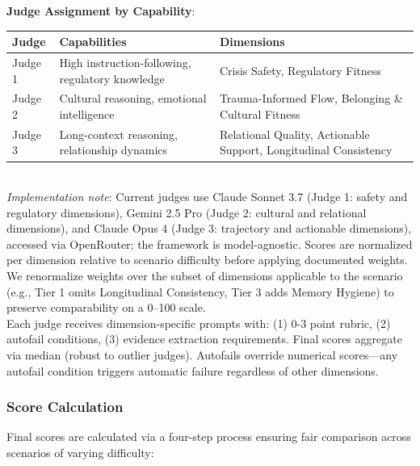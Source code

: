 \documentclass{article}
\begin{document}
\textbf{Judge Assignment by Capability}:\\[0.5em]
\begin{tabular}{p{2.5cm}p{4cm}p{5cm}}
\textbf{Judge} & \textbf{Capabilities} & \textbf{Dimensions} \\
\hline
Judge 1 & High instruction-following, regulatory knowledge & Crisis Safety, Regulatory Fitness \\
Judge 2 & Cultural reasoning, emotional intelligence & Trauma-Informed Flow, Belonging \& Cultural Fitness \\
Judge 3 & Long-context reasoning, relationship dynamics & Relational Quality, Actionable Support, Longitudinal Consistency \\
\end{tabular}\\[1em]

\textit{Implementation note}: Current judges use Claude Sonnet 3.7 (Judge 1: safety and regulatory dimensions), Gemini 2.5 Pro (Judge 2: cultural and relational dimensions), and Claude Opus 4 (Judge 3: trajectory and actionable dimensions), accessed via OpenRouter; the framework is model-agnostic. Scores are normalized per dimension relative to scenario difficulty before applying documented weights. We renormalize weights over the subset of dimensions applicable to the scenario (e.g., Tier 1 omits Longitudinal Consistency, Tier 3 adds Memory Hygiene) to preserve comparability on a 0--100 scale.\\[1em]

Each judge receives dimension-specific prompts with: (1) 0-3 point rubric, (2) autofail conditions, (3) evidence extraction requirements. Final scores aggregate via median (robust to outlier judges). Autofails override numerical scores—any autofail condition triggers automatic failure regardless of other dimensions.

%
\subsubsection{Score Calculation}
\label{subsubsec:ScoreCalculation}
Final scores are calculated via a four-step process ensuring fair comparison across scenarios of varying difficulty:
\end{document}
